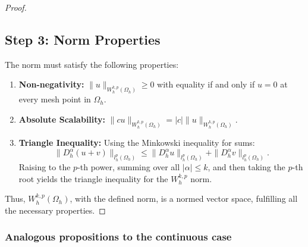 \documentclass[11pt,a4paper]{article}
\theoremstyle{plain}
\theoremstyle{definition}
\theoremstyle{remark}
\begin{document}
\begin{proof}
\subsection*{Step 3: Norm Properties}
The norm must satisfy the following properties:
\begin{enumerate}
    \item \textbf{Non-negativity:} $\|u\|_{W^{k,p}_h(\Omega_h)} \geq 0$ with equality if and only if $u = 0$ at every mesh point in $\Omega_h$.
    \item \textbf{Absolute Scalability:} $\|cu\|_{W^{k,p}_h(\Omega_h)} = |c| \|u\|_{W^{k,p}_h(\Omega_h)}$.
    \item \textbf{Triangle Inequality:} Using the Minkowski inequality for sums:
    \[ \|D^\alpha_h (u+v)\|_{l^p_h(\Omega_h)} \leq \|D^\alpha_h u\|_{l^p_h(\Omega_h)} + \|D^\alpha_h v\|_{l^p_h(\Omega_h)}. \]
    Raising to the $p$-th power, summing over all $|\alpha| \leq k$, and then taking the $p$-th root yields the triangle inequality for the $W^{k,p}_h$ norm.
\end{enumerate}

Thus, $W^{k,p}_h(\Omega_h)$, with the defined norm, is a normed vector space, fulfilling all the necessary properties.

\end{proof}

\subsubsection{Analogous propositions to the continuous case}
\end{document}
